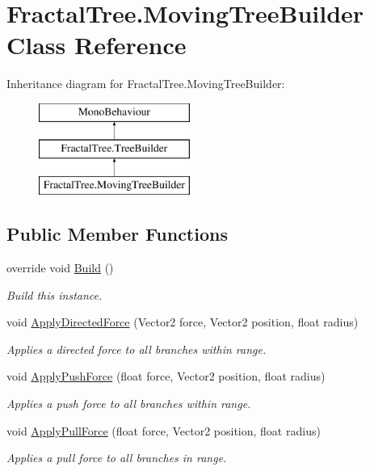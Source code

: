 \hypertarget{class_fractal_tree_1_1_moving_tree_builder}{}\section{Fractal\+Tree.\+Moving\+Tree\+Builder Class Reference}
\label{class_fractal_tree_1_1_moving_tree_builder}
Inheritance diagram for Fractal\+Tree.\+Moving\+Tree\+Builder\+:\begin{figure}[H]
\begin{center}
\leavevmode
\includegraphics[height=3.000000cm]{class_fractal_tree_1_1_moving_tree_builder}
\end{center}
\end{figure}
\subsection*{Public Member Functions}
\begin{DoxyCompactItemize}
\item 
override void \hyperlink{class_fractal_tree_1_1_moving_tree_builder_a4c58924b1d19c896cd1af1256ce242eb}{Build} ()
\begin{DoxyCompactList}\small\item\em Build this instance. \end{DoxyCompactList}\item 
void \hyperlink{class_fractal_tree_1_1_moving_tree_builder_a7da9440aa0482b959854bb28ff281a9a}{Apply\+Directed\+Force} (Vector2 force, Vector2 position, float radius)
\begin{DoxyCompactList}\small\item\em Applies a directed force to all branches within range. \end{DoxyCompactList}\item 
void \hyperlink{class_fractal_tree_1_1_moving_tree_builder_aac060965e91832c1dfefd94b7c9b152b}{Apply\+Push\+Force} (float force, Vector2 position, float radius)
\begin{DoxyCompactList}\small\item\em Applies a push force to all branches within range. \end{DoxyCompactList}\item 
void \hyperlink{class_fractal_tree_1_1_moving_tree_builder_ace24108b660cb1dcebb609eef51588ed}{Apply\+Pull\+Force} (float force, Vector2 position, float radius)
\begin{DoxyCompactList}\small\item\em Applies a pull force to all branches in range. \end{DoxyCompactList}\end{DoxyCompactItemize}
